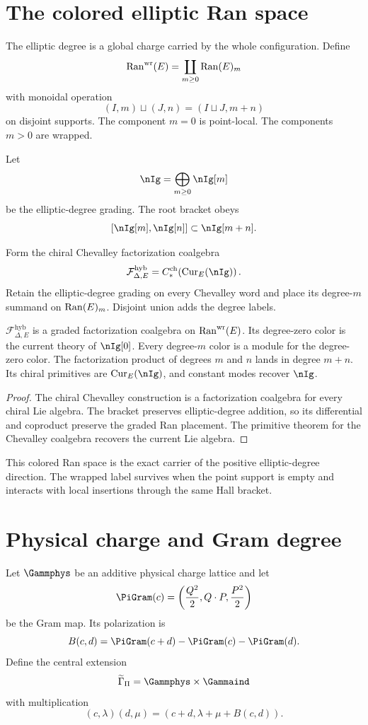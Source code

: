 \chapter{The colored elliptic Ran space}
The elliptic degree is a global charge carried by the whole configuration.  Define
\[
 \operatorname{Ran}^{\mathrm{wr}}(E)=\coprod_{m\ge0}\operatorname{Ran}(E)_m
\]
with monoidal operation
\[
 (I,m)\sqcup(J,n)=(I\sqcup J,m+n)
\]
on disjoint supports.  The component $m=0$ is point-local.  The components $m>0$ are wrapped.

Let
\[
 \nIg=\bigoplus_{m\ge0}\nIg[m]
\]
be the elliptic-degree grading.  The root bracket obeys
\[
 [\nIg[m],\nIg[n]]\subset\nIg[m+n].
\]

\begin{construction}
Form the chiral Chevalley factorization coalgebra
\[
 \mathcal F^{\mathrm{hyb}}_{\Delta,E}
 =C_*^{\mathrm{ch}}\!\left(\Cur_E(\nIg)\right).
\]
Retain the elliptic-degree grading on every Chevalley word and place its degree-$m$ summand on $\operatorname{Ran}(E)_m$.  Disjoint union adds the degree labels.
\end{construction}

\begin{theorem}
$\mathcal F^{\mathrm{hyb}}_{\Delta,E}$ is a graded factorization coalgebra on $\operatorname{Ran}^{\mathrm{wr}}(E)$.  Its degree-zero color is the current theory of $\nIg[0]$.  Every degree-$m$ color is a module for the degree-zero color.  The factorization product of degrees $m$ and $n$ lands in degree $m+n$.  Its chiral primitives are $\Cur_E(\nIg)$, and constant modes recover $\nIg$.
\end{theorem}
\begin{proof}
The chiral Chevalley construction is a factorization coalgebra for every chiral Lie algebra.  The bracket preserves elliptic-degree addition, so its differential and coproduct preserve the graded Ran placement.  The primitive theorem for the Chevalley coalgebra recovers the current Lie algebra.
\end{proof}

This colored Ran space is the exact carrier of the positive elliptic-degree direction.  The wrapped label survives when the point support is empty and interacts with local insertions through the same Hall bracket.

\chapter{Physical charge and Gram degree}
Let $\Gammphys$ be an additive physical charge lattice and let
\[
 \PiGram(c)=\left(\frac{Q^2}{2},Q\cdot P,\frac{P^2}{2}\right)
\]
be the Gram map.  Its polarization is
\[
 B(c,d)=\PiGram(c+d)-\PiGram(c)-\PiGram(d).
\]
Define the central extension
\[
 \widetilde\Gamma_\Pi=\Gammphys\times\Gammaind
\]
with multiplication
\[
 (c,\lambda)(d,\mu)
 =(c+d,\lambda+\mu+B(c,d)).
\]

